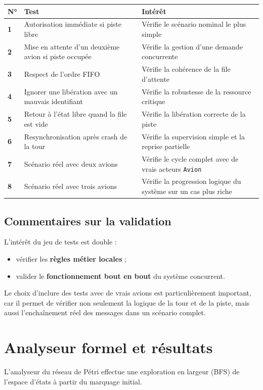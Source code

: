 \documentclass[11pt,a4paper]{article}
\begin{document}
\begin{longtable}{>{\bfseries}p{0.9cm} p{5.4cm} p{8.1cm}}
\toprule
N° & Test & Intérêt \\
\midrule
1 & Autorisation immédiate si piste libre & Vérifie le scénario nominal le plus simple \\
2 & Mise en attente d'un deuxième avion si piste occupée & Vérifie la gestion d'une demande concurrente \\
3 & Respect de l'ordre FIFO & Vérifie la cohérence de la file d'attente \\
4 & Ignorer une libération avec un mauvais identifiant & Vérifie la robustesse de la ressource critique \\
5 & Retour à l'état libre quand la file est vide & Vérifie la libération correcte de la piste \\
6 & Resynchronisation après crash de la tour & Vérifie la supervision simple et la reprise partielle \\
7 & Scénario réel avec deux avions & Vérifie le cycle complet avec de vrais acteurs \texttt{Avion} \\
8 & Scénario réel avec trois avions & Vérifie la progression logique du système sur un cas plus riche \\
\bottomrule
\end{longtable}

\subsection{Commentaires sur la validation}

L'intérêt du jeu de tests est double :
\begin{itemize}
    \item vérifier les \textbf{règles métier locales} ;
    \item valider le \textbf{fonctionnement bout en bout} du système concurrent.
\end{itemize}

Le choix d'inclure des tests avec de vrais avions est particulièrement important, car il permet de vérifier non seulement la logique de la tour et de la piste, mais aussi l'enchaînement réel des messages dans un scénario complet.


\section{Analyseur formel et résultats}

L'analyseur du réseau de Pétri effectue une exploration en largeur (BFS) de l'espace d'états à partir du marquage initial.
\end{document}
